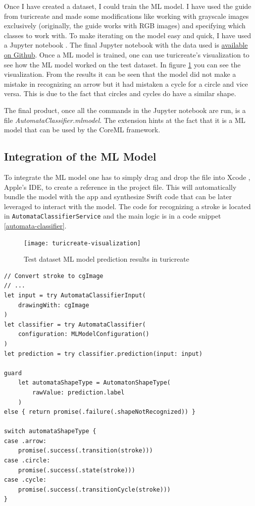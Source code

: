 Once I have created a dataset, I could train the ML model. I have used the guide from turicreate and made some modifications like working with grayscale images exclusively (originally, the guide works with RGB images) and specifying which classes to work with. To make iterating on the model easy and quick, I have used a Jupyter notebook \cite{jupyter}. The final Jupyter notebook with the data used is \href{https://github.com/fortmarek/automata-editor-model/}{available on Github}. Once a ML model is trained, one can use turicreate's visualization to see how the ML model worked on the test dataset. In figure \ref{turicreate-visualization} you can see the visualization. From the results it can be seen that the model did not make a mistake in recognizing an arrow but it had mistaken a cycle for a circle and vice versa. This is due to the fact that circles and cycles do have a similar shape.

The final product, once all the commands in the Jupyter notebook are run, is a file \textit{AutomataClassifier.mlmodel}. The extension hints at the fact that it is a ML model that can be used by the CoreML framework.

\subsection{Integration of the ML Model}

To integrate the ML model one has to simply drag and drop the file into Xcode \cite{xcode}, Apple's IDE, to create a reference in the project file. This will automatically bundle the model with the app and synthesize Swift code that can be later leveraged to interact with the model. The code for recognizing a stroke is located in \lstinline{AutomataClassifierService} and the main logic is in a code snippet \ref{automata-classifier}.

\begin{figure}
    \texttt{[image: turicreate-visualization]}
    \caption{Test dataset ML model prediction results in turicreate}\label{turicreate-visualization}
\end{figure}

\begin{lstlisting}[caption=Automata classifier, label=automata-classifier]
// Convert stroke to cgImage
// ...
let input = try AutomataClassifierInput(
    drawingWith: cgImage
)
let classifier = try AutomataClassifier(
    configuration: MLModelConfiguration()
)
let prediction = try classifier.prediction(input: input)

guard
    let automataShapeType = AutomatonShapeType(
        rawValue: prediction.label
    )
else { return promise(.failure(.shapeNotRecognized)) }

switch automataShapeType {
case .arrow:
    promise(.success(.transition(stroke)))
case .circle:
    promise(.success(.state(stroke)))
case .cycle:
    promise(.success(.transitionCycle(stroke)))
}
\end{lstlisting}


